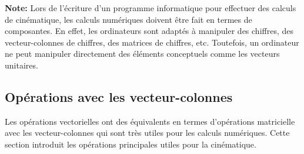\textbf{Note:} Lors de l'écriture d'un programme informatique pour effectuer des calculs de cinématique, les calculs numériques doivent être fait en termes de composantes. En effet, les ordinateurs sont adaptés à manipuler des chiffres, des vecteur-colonnes de chiffres, des matrices de chiffres, etc. Toutefois, un ordinateur ne peut manipuler directement des éléments conceptuels comme les vecteurs unitaires.  

\subsection{Opérations avec les vecteur-colonnes} 
%
Les opérations vectorielles ont des équivalents en termes d'opérations matricielle avec les vecteur-colonnes qui sont très utiles pour les calculs numériques. Cette section introduit les opérations principales utiles pour la cinématique.

